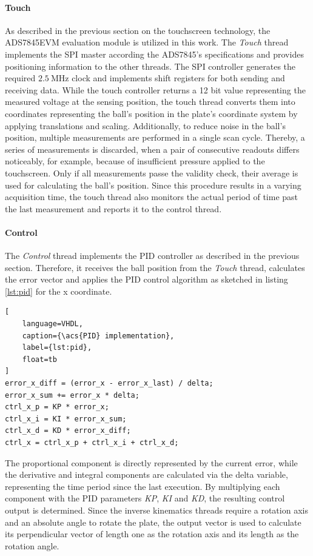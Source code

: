 \paragraph{Touch} As described in the previous section on the touchscreen
technology, the ADS7845EVM evaluation module is utilized in this work. The
\emph{Touch} thread implements the \ac{SPI} master according the ADS7845's
specifications and provides positioning information to the other threads. The
\ac{SPI} controller generates the required $\SI{2.5}{\mega\hertz}$ clock and
implements shift registers for both sending and receiving data. While the
touch controller returns a 12 bit value representing the measured voltage at
the sensing position, the touch thread converts them into coordinates
representing the ball's position in the plate's coordinate system by applying
translations and scaling. Additionally, to reduce noise in the ball's
position, multiple measurements are performed in a single scan cycle. Thereby,
a series of measurements is discarded, when a pair of consecutive readouts
differs noticeably, for example, because of insufficient pressure applied to
the touchscreen. Only if all measurements passe the validity check, their
average is used for calculating the ball's position. Since this procedure
results in a varying acquisition time, the touch thread also monitors the
actual period of time past the last measurement and reports it to the control
thread.

\paragraph{Control} The \emph{Control} thread implements the \ac{PID}
controller as described in the previous section. Therefore, it receives the
ball position from the \emph{Touch} thread, calculates the error vector and
applies the \ac{PID} control algorithm as sketched in listing \ref{lst:pid}
for the x coordinate.
\begin{lstlisting}[
	language=VHDL,
	caption={\acs{PID} implementation},
	label={lst:pid},
	float=tb
]
error_x_diff = (error_x - error_x_last) / delta;
error_x_sum += error_x * delta;
ctrl_x_p = KP * error_x;
ctrl_x_i = KI * error_x_sum;
ctrl_x_d = KD * error_x_diff;
ctrl_x = ctrl_x_p + ctrl_x_i + ctrl_x_d;
\end{lstlisting}
The proportional component is directly represented by the current error, while
the derivative and integral components are calculated via the delta variable,
representing the time period since the last execution. By multiplying each
component with the \ac{PID} parameters \emph{KP}, \emph{KI} and \emph{KD}, the
resulting control output is determined. Since the inverse kinematics threads
require a rotation axis and an absolute angle to rotate the plate, the output
vector is used to calculate its perpendicular vector of length one as the
rotation axis and its length as the rotation angle.

